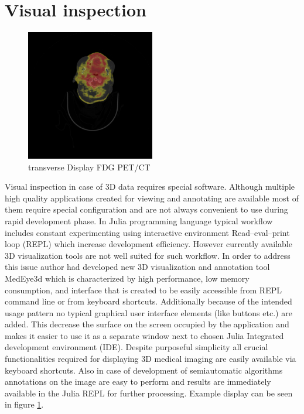 \documentclass{juliacon}
\begin{document}
\section{Visual inspection}

\begin{figure}[t!]
	\centering
	\includegraphics[width=0.5\textwidth]{PETCTCORONAL.png}
	\caption{transverse Display FDG PET/CT}
	\label{fig:PETCTCORONAL}
	\centering
\end{figure}

Visual inspection in case of 3D data requires special software. Although multiple high quality applications created for viewing and annotating are available most of them require special configuration and are not always convenient to use during rapid development phase. In Julia programming language typical workflow includes constant experimenting using interactive environment Read–eval–print loop (REPL) which increase development efficiency. However currently available 3D visualization tools are not well suited for such workflow. In order to address this issue author had developed new  3D visualization and annotation tool MedEye3d \cite{Mitura2021} which is characterized by high performance, low memory consumption, and interface that is created to be easily accessible from REPL command line or from keyboard shortcuts. Additionally because of the intended usage pattern no typical graphical user interface elements (like buttons etc.) are added. This decrease the surface on the screen occupied by the application and makes it easier to use it as a separate window next to chosen Julia Integrated development environment (IDE). Despite purposeful simplicity all crucial functionalities required for displaying 3D medical imaging are easily available via keyboard shortcuts. Also in case of development of semiautomatic algorithms annotations on the image are easy to perform and results are immediately available in the Julia REPL for further processing. Example display can be seen in figure \ref{fig:PETCTCORONAL}.
\end{document}

